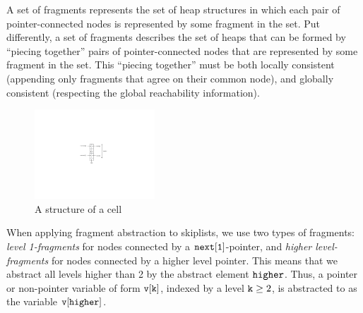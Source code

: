 A set of fragments represents the set of heap
structures in which each pair of pointer-connected nodes is represented by some
fragment in the set.
Put differently, a set of fragments describes the set of heaps that can be formed by
``piecing together'' pairs of pointer-connected nodes that are represented
by some fragment in the set. This ``piecing together'' must
be both locally consistent (appending only fragments that agree on their
common node), and globally consistent (respecting the global reachability
information).
\begin{figure} 
\vspace{-30pt}
  \begin{center}
 \includegraphics[width=0.4\textwidth, trim={13cm 10cm 12cm 9cm}, clip]{skipcell.pdf}  
\vspace*{-0.6cm}
    \caption{A structure of a cell}
    \label{skipcell}
  \end{center}
  \vspace{-40pt}
  \vspace{1pt}
\end{figure}
When applying fragment abstraction to skiplists, we  use two types of fragments:
{\em level 1-fragments} for
nodes connected by a $\tt next[1]$-pointer, and {\em higher level-fragments} for
nodes connected by a higher level pointer. This means that we abstract all levels
higher than 2 by the abstract element $\tt higher$. Thus, a pointer or
non-pointer variable of form $\tt v[k]$, indexed by a level ${\tt k} \geq 2$, is
abstracted to as the variable $\tt v[higher]$.

